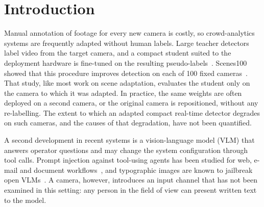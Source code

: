 \section{Introduction}
Manual annotation of footage for every new camera is costly, so crowd-analytics systems are frequently adapted
without human labels. Large teacher detectors label video from the target camera, and a compact student suited to
the deployment hardware is fine-tuned on the resulting
pseudo-labels~\cite{radosavovic2018datadistill,xie2020noisystudent,zhang2023scenes100}. Scenes100 showed that this
procedure improves detection on each of 100 fixed cameras~\cite{zhang2023scenes100}. That study, like most work on
scene adaptation, evaluates the student only on the camera to which it was adapted. In practice, the same weights are
often deployed on a second camera, or the original camera is repositioned, without any re-labelling. The extent to
which an adapted compact real-time detector degrades on such cameras, and the causes of that degradation, have not
been quantified.

A second development in recent systems is a vision-language model (VLM) that answers operator questions and may
change the system configuration through tool calls. Prompt injection against tool-using agents has been studied for
web, e-mail and document workflows~\cite{debenedetti2024agentdojo,zhan2024injecagent}, and typographic images are known
to jailbreak open VLMs~\cite{gong2025figstep}. A camera, however, introduces an input channel that has not been
examined in this setting: any person in the field of view can present written text to the model.

